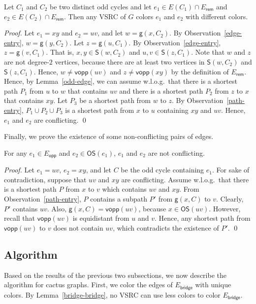 \documentclass[letter,runningheads,envcountsame,envcountsect]{llncs}
\newcommand{\cvsrc}{VSRC}
\newcommand{\et}{E_{\mathsf{bridge}}}
\newcommand{\eopp}{E_{\mathsf{opp}}}
\newcommand{\erem}{E_{\mathsf{rem}}}
\newcommand{\vopp}{\mathsf{vopp}}
\newcommand{\os}{\mathsf{OS}}
\newcommand{\g}{\mathsf{g}}
\newcommand{\subg}{\mathsf{S}}
\begin{document}
\begin{lemma} 
	\label{erem-oddcycle}
Let $C_1$ and $C_2$ be two distinct odd cycles and let $e_1 \in E(C_1)\cap \erem$ and $e_2 \in E(C_2)\cap \erem$. Then any {\cvsrc} of $G$ colors $e_1$ and $e_2$ with different colors.
\end{lemma}
\begin{proof}
Let $e_1=xy$ and $e_2=uv$, and let $w=\g(x,C_2)$. By Observation~\ref{edge-entry}, $w=\g(y,C_2)$. Let $z=\g(u,C_1)$. By Observation~\ref{edge-entry}, $z=\g(v,C_1)$. That is, $x,y\in \subg(w,C_2)$ and $u,v\in \subg(z,C_1)$. Note that $w$ and $z$ are not degree-$2$ vertices, because there are at least two vertices in $\subg(w,C_2)$ and $\subg(z,C_1)$. Hence, $w\neq \vopp(uv)$ and $z\neq \vopp(xy)$ by the definition of $\erem$.	Hence, by Lemma~\ref{odd-edge}, we can assume w.l.o.g.\ that there is a shortest path $P_1$ from $u$ to $w$ that contains $uv$ and there is a shortest path $P_2$ from $z$ to $x$ that contains $xy$.
	Let $P_3$ be a shortest path from $w$ to $z$.
By Observation~\ref{path-entry}, 
$P_1\cup P_2\cup P_3$ is a shortest path from $x$ to $u$ containing $xy$ and $uv$. Hence, $e_1$ and $e_2$ are conflicting.
\qed\end{proof}

Finally, we prove the existence of some non-conflicting pairs of edges.

\begin{lemma} \label{opp-valid}
For any $e_1\in \eopp$ and $e_2\in \os\left( e_1 \right)$, $e_1$ and $e_2$ are not conflicting.
\end{lemma}
\begin{proof}
Let $e_1=uv$, $e_2=xy$, and let $C$ be the odd cycle containing $e_1$. For sake of contradiction, suppose that $uv$ and $xy$ are conflicting.	Assume w.l.o.g.\ that there is a shortest path $P$ from $x$ to $v$ which contains $uv$ and $xy$. From Observation~\ref{path-entry}, $P$ contains a subpath $P'$ from $\g(x,C)$ to $v$. Clearly, $P'$ contains $uv$. Also, $\g(x,C)=\vopp(uv)$, because $x\in \os(uv)$. However, recall that $\vopp(uv)$ is equidistant from $u$ and $v$. Hence, any shortest path from $\vopp(uv)$ to $v$ does not contain $uv$, which contradicts the existence of $P'$.
\qed\end{proof}


\subsection{Algorithm}
Based on the results of the previous two subsections, we now describe the algorithm for cactus graphs.
First, we color the edges of $\et$ with unique colors. By Lemma~\ref{bridge-bridge}, no VSRC can use less colors to color $\et$.
\end{document}
